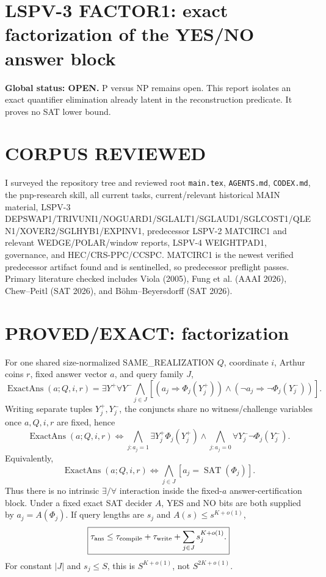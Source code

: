 \documentclass[11pt]{article}
\begin{document}
\section*{LSPV-3 FACTOR1: exact factorization of the YES/NO answer block}
\textbf{Global status: OPEN.} P versus NP remains open. This report isolates an exact quantifier elimination already latent in the reconstruction predicate. It proves no SAT lower bound.

\section*{CORPUS REVIEWED}
I surveyed the repository tree and reviewed root \texttt{main.tex}, \texttt{AGENTS.md}, \texttt{CODEX.md}, the pnp-research skill, all current tasks, current/relevant historical MAIN material, LSPV-3 DEPSWAP1/TRIVUNI1/NOGUARD1/SGLALT1/SGLAUD1/SGLCOST1/QLEN1/XOVER2/SGLHYB1/EXPINV1, predecessor LSPV-2 MATCIRC1 and relevant WEDGE/POLAR/window reports, LSPV-4 WEIGHTPAD1, governance, and HEC/CRS-PPC/CCSPC. MATCIRC1 is the newest verified predecessor artifact found and is sentinelled, so predecessor preflight passes. Primary literature checked includes Viola (2005), Fung et al. (AAAI 2026), Chew--Peitl (SAT 2026), and B\"ohm--Beyersdorff (SAT 2026).

\section*{PROVED/EXACT: factorization}
For one shared size-normalized SAME\_REALIZATION \(Q\), coordinate \(i\), Arthur coins \(r\), fixed answer vector \(a\), and query family \(J\),
\[
\operatorname{ExactAns}(a;Q,i,r)=
\exists Y^+\forall Y^-\bigwedge_{j\in J}
[(a_j\Rightarrow\Phi_j(Y_j^+))\wedge
(\neg a_j\Rightarrow\neg\Phi_j(Y_j^-))].
\]
Writing separate tuples \(Y_j^+,Y_j^-\), the conjuncts share no witness/challenge variables once \(a,Q,i,r\) are fixed, hence
\[
\operatorname{ExactAns}(a;Q,i,r)\iff
\bigwedge_{j:a_j=1}\exists Y_j^+\Phi_j(Y_j^+)
\wedge
\bigwedge_{j:a_j=0}\forall Y_j^-\neg\Phi_j(Y_j^-).
\]
Equivalently,
\[
\boxed{\operatorname{ExactAns}(a;Q,i,r)\iff
\bigwedge_{j\in J}[a_j=\operatorname{SAT}(\Phi_j)].}
\]
Thus there is no intrinsic \(\exists/\forall\) interaction inside the fixed-\(a\) answer-certification block. Under a fixed exact SAT decider \(A\), YES and NO bits are both supplied by \(a_j=A(\Phi_j)\). If query lengths are \(s_j\) and \(A(s)\le s^{K+o(1)}\),
\[
\boxed{\tau_{\rm ans}\le\tau_{\rm compile}+\tau_{\rm write}
+\sum_{j\in J}s_j^{K+o(1)}.}
\]
For constant \(|J|\) and \(s_j\le S\), this is \(S^{K+o(1)}\), not \(S^{2K+o(1)}\).
\end{document}
